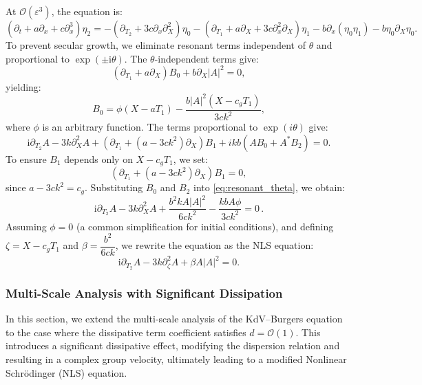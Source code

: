 \documentclass[alpha-refs, 12pt]{wiley-article}
\renewcommand{\O}{\mathcal{O}}
\newcommand{\ui}{\mathrm{i}}
\newcommand{\eps}{\varepsilon}
\begin{document}
At $\O(\eps^3)$, the equation is:
\begin{equation}\label{eq:third_order}
  \left( \partial_t + a \partial_x + c \partial_x^3 \right) \eta_2 = - \left( \partial_{T_2} + 3 c \partial_x \partial_X^2 \right) \eta_0 - \left( \partial_{T_1} + a \partial_X + 3 c \partial_x^2 \partial_X \right) \eta_1 - b \partial_x ( \eta_0 \eta_1 ) - b \eta_0 \partial_X \eta_0.
\end{equation}
To prevent secular growth, we eliminate resonant terms independent of $\theta$ and proportional to $\exp(\pm \ui \theta)$. The $\theta$-independent terms give:
\begin{equation}\label{eq:B0_equation}
  \left( \partial_{T_1} + a \partial_X \right) B_0 + b \partial_X |A|^2 = 0,
\end{equation}
yielding:
\[
  B_0 = \phi(X - a T_1) - \frac{b |A|^2 (X - c_g T_1)}{3 c k^2},
\]
where $\phi$ is an arbitrary function. The terms proportional to $\exp(i \theta)$ give:
\begin{equation}\label{eq:resonant_theta}
  \ui \partial_{T_2} A - 3 k \partial_X^2 A + \left( \partial_{T_1} + (a - 3 c k^2) \partial_X \right) B_1 + i k b \left( A B_0 + A^* B_2 \right) = 0.
\end{equation}
To ensure $B_1$ depends only on $X - c_g T_1$, we set:
\[
\left( \partial_{T_1} + (a - 3 c k^2) \partial_X \right) B_1 = 0,
\]
since $a - 3 c k^2 = c_g$. Substituting $B_0$ and $B_2$ into \eqref{eq:resonant_theta}, we obtain:
\begin{equation*}%
  \ui \partial_{T_2} A - 3 k \partial_X^2 A + \frac{b^2 k A |A|^2}{6 c k^2} - \frac{k b A \phi}{3 c k^2} = 0\,.
\end{equation*}
Assuming $\phi = 0$ (a common simplification for initial conditions), and defining $\zeta = X - c_g T_1$ and $\beta = \dfrac{b^2}{6 c k}$, we rewrite the equation as the NLS equation:
\begin{equation}\label{eq:NLS_final}
  \ui \partial_{T_2} A - 3 k \partial_\zeta^2 A + \beta A |A|^2 = 0.
\end{equation}

\subsubsection{Multi-Scale Analysis with Significant Dissipation}

In this section, we extend the multi-scale analysis of the KdV--Burgers equation to the case where the dissipative term coefficient satisfies $d = \O(1)$. This introduces a significant dissipative effect, modifying the dispersion relation and resulting in a complex group velocity, ultimately leading to a modified Nonlinear Schr\"odinger (NLS) equation.
\end{document}
